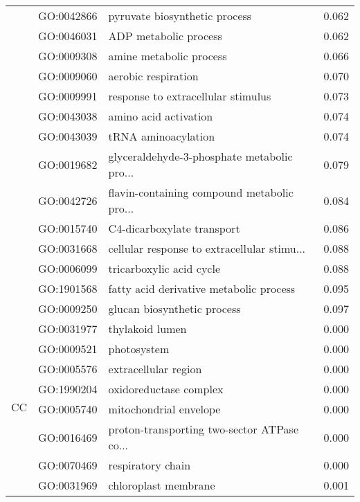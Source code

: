 \begin{longtable}{lllr}
   & GO:0042866 &                pyruvate biosynthetic process &         0.062 \\
   & GO:0046031 &                        ADP metabolic process &         0.062 \\
   & GO:0009308 &                      amine metabolic process &         0.066 \\
   & GO:0009060 &                          aerobic respiration &         0.070 \\
   & GO:0009991 &           response to extracellular stimulus &         0.073 \\
   & GO:0043038 &                        amino acid activation &         0.074 \\
   & GO:0043039 &                          tRNA aminoacylation &         0.074 \\
   & GO:0019682 &  glyceraldehyde-3-phosphate metabolic pro... &         0.079 \\
   & GO:0042726 &  flavin-containing compound metabolic pro... &         0.084 \\
   & GO:0015740 &                   C4-dicarboxylate transport &         0.086 \\
   & GO:0031668 &  cellular response to extracellular stimu... &         0.088 \\
   & GO:0006099 &                     tricarboxylic acid cycle &         0.088 \\
   & GO:1901568 &      fatty acid derivative metabolic process &         0.095 \\
   & GO:0009250 &                  glucan biosynthetic process &         0.097 \\
\cline{1-4}
\multirow{22}{*}{CC} & GO:0031977 &                              thylakoid lumen &         0.000 \\
   & GO:0009521 &                                  photosystem &         0.000 \\
   & GO:0005576 &                         extracellular region &         0.000 \\
   & GO:1990204 &                       oxidoreductase complex &         0.000 \\
   & GO:0005740 &                       mitochondrial envelope &         0.000 \\
   & GO:0016469 &  proton-transporting two-sector ATPase co... &         0.000 \\
   & GO:0070469 &                            respiratory chain &         0.000 \\
   & GO:0031969 &                         chloroplast membrane &         0.001 \\

\end{longtable}
